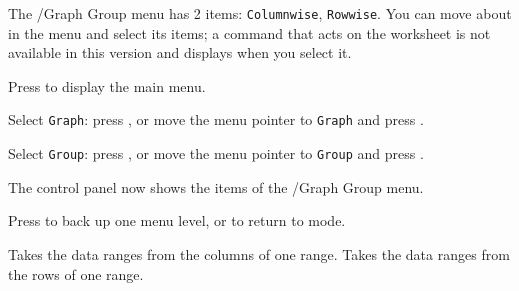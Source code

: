 The /Graph Group menu has 2 items: \texttt{Columnwise}, \texttt{Rowwise}.  You can move about in the menu and select its items; a command that acts on the worksheet is not available in this version and displays  when you select it.
\begin{Steps123}
\item Press  to display the main menu.
\item Select \texttt{Graph}: press , or move the menu pointer to \texttt{Graph} and press .
\item Select \texttt{Group}: press , or move the menu pointer to \texttt{Group} and press .
\item The control panel now shows the items of the /Graph Group menu.
\item Press  to back up one menu level, or  to return to  mode.
\end{Steps123}
\begin{Options}
 Takes the data ranges from the columns of one range.
 Takes the data ranges from the rows of one range.
\end{Options}
